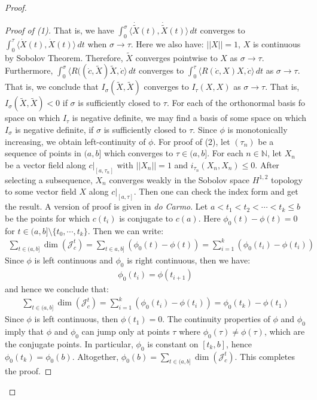 \documentclass[11pt]{book}
\theoremstyle{break}
\theoremstyle{break}
\newcommand{\N}{\mathbb{N}}
\newcommand{\that}[1]{\widetilde{#1}}
\begin{document}
\begin{proof}
\begin{proof}[Proof of (1)]
That is, we have $\int_0^{\sigma} \langle \dot{\that{X}}(t), \dot{\that{X}}(t) \rangle \, dt$ converges to $\int_0^\tau \langle \dot{X}(t), \dot{X}(t) \rangle \, dt$ when $\sigma \to \tau$. Here we also have: $||X|| =1$, $X$ is continuous by Sobolov Theorem. Therefore, $\that{X}$ converges pointwise to $X$ as $\sigma \to \tau$. Furthermore, $\int_0^\sigma \langle R((\dot{c}, \that{X}) \that{X}, \dot{c}\rangle \, dt$ converges to $\int_0^\tau \langle R(\dot{c}, X)X, \dot{c}\rangle \, dt$ as $\sigma \to \tau$. That is, we conclude that $I_{\sigma} (\that{X},\that{X} ) $ converges to $I_{\tau}(X,X)$ as $\sigma \to \tau$. That is, $I_\sigma (\that{X},\that{X}) <0$ if $\sigma$ is sufficiently closed to $\tau$. For each of the orthonormal basis fo space on which $I_\tau$ is negative definite, we may find a basis of some space on which $I_\sigma$ is negative definite, if $\sigma$ is sufficiently closed to $\tau$. Since $\phi$ is monotonically increasing, we obtain left-continuity of $\phi$. For proof of (2), let $(\tau_n)$ be a sequence of points in $(a,b]$ which converges to $\tau \in (a,b]$. For each $n \in \N$, let $X_n$ be a vector field along $c|_{[a,\tau_n]}$ with $||X_n||  =1$ and $i_{\tau_n}(X_n,X_n) \leq 0$. After selecting a subsequence, $X_n$ converges weakly in the Sobolov space $H^{1,2}$ topology to some vector field $X$ along $c|_{[a,\tau]}$. Then one can check the index form and get the result. A version of proof is given in \textit{do Carmo}. Let $a<t_1<t_2<\cdots<t_k\leq b$ be the points for which $c(t_i)$ is conjugate to $c(a)$. Here $\phi_0(t) - \phi(t) = 0$ for $t \in (a,b]\setminus \{t_0, \cdots, t_k\}$. Then we can write:
\begin{align*}
\sum_{t\in (a,b]}\dim(\mathcal{J}_c^t) = \sum_{t\in a,b]}(\phi_0(t) - \phi(t))  = \sum_{i=1}^k ( \phi_0(t_i) - \phi(t_i))
\end{align*}  
Since $\phi$ is left continuous and $\phi_0$ is right continuous, then we have:
\begin{align*}
\phi_0(t_i) = \phi(t_{i+1})
\end{align*}
and hence we conclude that:
\begin{align*}
\sum_{t\in (a,b]}\dim(\mathcal{J}_c^t) = \sum_{i=1}^k ( \phi_0(t_i) - \phi(t_i)) = \phi_0(t_k) - \phi(t_1)
\end{align*}
Since $\phi$ is left continuous, then $\phi(t_1) = 0$. The continuity properties of $\phi$ and $\phi_0$ imply that $\phi$ and $\phi_0$ can jump only at points $\tau$ where $\phi_0(\tau) \neq \phi(\tau)$, which are the conjugate points. In particular, $\phi_0$ is constant on $[t_k,b]$, hence $\phi_0(t_k) = \phi_0(b)$. Altogether, $\phi_0(b) = \sum_{t \in (a,b]}\dim(\mathcal{J}_c^t)$. This completes the proof.  
\end{proof}
\end{proof}
\end{document}
